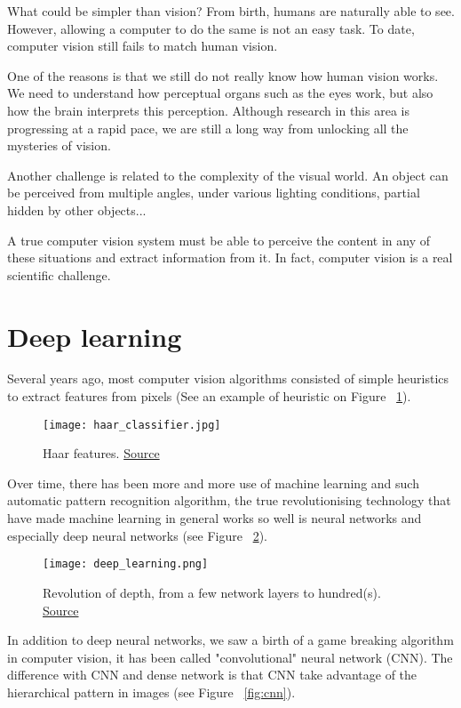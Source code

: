 What could be simpler than vision? From birth, humans are naturally able to see. However, allowing a computer to do the same is not an easy task. To date, computer vision still fails to match human vision.

One of the reasons is that we still do not really know how human vision works. We need to understand how perceptual organs such as the eyes work, but also how the brain interprets this perception. Although research in this area is progressing at a rapid pace, we are still a long way from unlocking all the mysteries of vision.

Another challenge is related to the complexity of the visual world. An object can be perceived from multiple angles, under various lighting conditions, partial hidden by other objects...

A true computer vision system must be able to perceive the content in any of these situations and extract information from it. In fact, computer vision is a real scientific challenge.

\pagebreak\section{Deep learning}

Several years ago, most computer vision algorithms consisted of simple heuristics to extract features from pixels (See an example of heuristic on Figure ~\ref{fig:haar}).
\begin{figure}[H]
  \centering
  \texttt{[image: haar\_classifier.jpg]}
  \caption{Haar features. \href{https://towardsdatascience.com/learning-computer-vision-41398ad9941f}{Source}}
  \label{fig:haar}
\end{figure}
Over time, there has been more and more use of machine learning and such automatic pattern recognition algorithm, the true revolutionising technology that have made machine learning in general works so well is neural networks and especially deep neural networks (see Figure ~\ref{fig:deeplearning}).

\begin{figure}[H]
  \centering
  \texttt{[image: deep\_learning.png]}
  \caption{Revolution of depth, from a few network layers to hundred(s). \href{https://towardsdatascience.com/learning-computer-vision-41398ad9941f}{Source}}
  \label{fig:deeplearning}
\end{figure}
\pagebreak
In addition to deep neural networks, we saw a birth of a game breaking algorithm in computer vision, it has been called "convolutional" neural network (CNN)\cite{originalcnn}.
The difference with CNN and dense network is that CNN take advantage of the hierarchical pattern in images (see Figure ~\ref{fig:cnn}).

